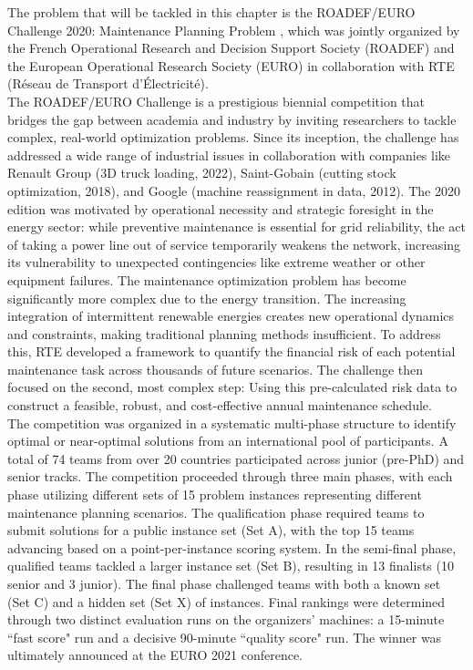 The problem that will be tackled in this chapter is the ROADEF/EURO Challenge 2020: Maintenance Planning Problem \cite{roadef2020}, which was jointly organized by the French Operational Research and Decision Support Society (ROADEF) and the European Operational Research Society (EURO) in collaboration with RTE (Réseau de Transport d'Électricité).\\

The ROADEF/EURO Challenge is a prestigious biennial competition that bridges the gap between academia and industry by inviting researchers to tackle complex, real-world optimization problems. Since its inception, the challenge has addressed a wide range of industrial issues in collaboration with companies like Renault Group (3D truck loading, 2022), Saint-Gobain (cutting stock optimization, 2018), and Google (machine reassignment in data, 2012). The 2020 edition was motivated by operational necessity and strategic foresight in the energy sector: while preventive maintenance is essential for grid reliability, the act of taking a power line out of service temporarily weakens the network, increasing its vulnerability to unexpected contingencies like extreme weather or other equipment failures. The maintenance optimization problem has become significantly more complex due to the energy transition. The increasing integration of intermittent renewable energies creates new operational dynamics and constraints, making traditional planning methods insufficient. To address this, RTE developed a framework to quantify the financial risk of each potential maintenance task across thousands of future scenarios. The challenge then focused on the second, most complex step: Using this pre-calculated risk data to construct a feasible, robust, and cost-effective annual maintenance schedule.\\

The competition was organized in a systematic multi-phase structure to identify optimal or near-optimal solutions from an international pool of participants. A total of 74 teams from over 20 countries participated across junior (pre-PhD) and senior tracks. The competition proceeded through three main phases, with each phase utilizing different sets of 15 problem instances representing different maintenance planning scenarios. The qualification phase required teams to submit solutions for a public instance set (Set A), with the top 15 teams advancing based on a point-per-instance scoring system. In the semi-final phase, qualified teams tackled a larger instance set (Set B), resulting in 13 finalists (10 senior and 3 junior). The final phase challenged teams with both a known set (Set C) and a hidden set (Set X) of instances. Final rankings were determined through two distinct evaluation runs on the organizers' machines: a 15-minute ``fast score" run and a decisive 90-minute ``quality score" run. The winner was ultimately announced at the EURO 2021 conference. \\


